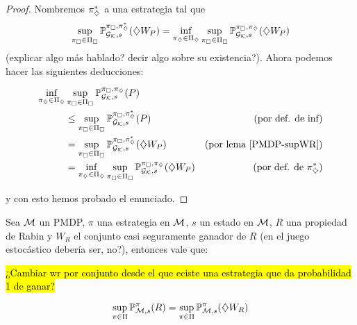 \begin{proof}
	Nombremos $\pidiam^*$ a una estrategia tal que $$ \sup_{\picuadset} \Prob_{\Gk, s}^{\picuad, \pidiam^*} (\alc W_P)= \inf_{\pidiamset} \sup_{\picuadset} \ProbG(\alc W_P)$$ (explicar algo más hablado? decir algo sobre su existencia?). Ahora podemos hacer las siguientes deducciones:

	\begin{align*}
		\inf_{\pidiamset} &\sup_{\picuadset} \ProbG(P) \\
		&\leq \sup_{\picuadset} \Prob_{\Gk, s}^{\picuad, \pidiam^*} (P) &\text{(por def. de inf)} \\
		&= \sup_{\picuadset} \Prob_{\Gk, s}^{\picuad, \pidiam^*} (\alc W_P) &\text{(por lema \ref{PMDP-supWR})} \\
		&= \inf_{\pidiamset} \sup_{\picuadset} \ProbG(\alc W_P) &\text{(por def. de $\pidiam^*$)}
	\end{align*}

	y con esto hemos probado el enunciado.
\end{proof}

\begin{lemma}
	\label{PMDP-supWR}
	Sea $\M$ un PMDP, $\pi$ una estrategia en $\M$, $s$ un estado en $\M$, $R$ una propiedad de Rabin y $W_R$ el conjunto casi seguramente ganador de $R$ (en el juego estocástico debería ser, no?), entonces vale que:


	\hl{¿Cambiar wr por conjunto desde el que eciste una estrategia que da probabilidad 1 de ganar?}

	$$
		\sup_{\pi \in \Pi} \ProbPMDP (R) = \sup_{\pi \in \Pi} \ProbPMDP (\alc W_R)
	$$
\end{lemma}

